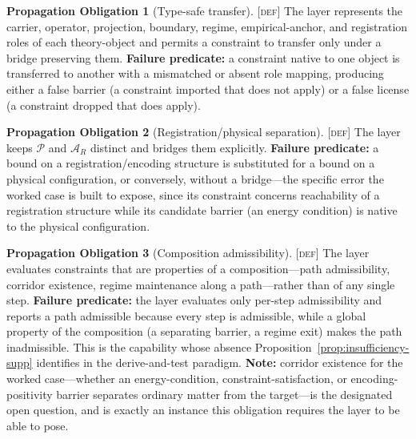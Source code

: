 \documentclass[11pt]{article}
\newcommand{\Pspace}{\ensuremath{\mathcal{P}}}
\newcommand{\ARspace}{\ensuremath{\mathcal{A}_{R}}}
\newcommand{\Defn}{\textsc{[def]}}
\theoremstyle{definition}
\newtheorem{sobligation}{Propagation Obligation}
\begin{document}
\begin{sobligation}[Type-safe transfer]\label{ob:transfer}
\Defn{} The layer represents the carrier, operator, projection, boundary, regime,
empirical-anchor, and registration roles of each theory-object and permits a
constraint to transfer only under a bridge preserving them. \textbf{Failure
predicate:} a constraint native to one object is transferred to another with a
mismatched or absent role mapping, producing either a false barrier (a constraint
imported that does not apply) or a false license (a constraint dropped that does
apply).
\end{sobligation}

\begin{sobligation}[Registration/physical separation]\label{ob:separation}
\Defn{} The layer keeps \Pspace{} and \ARspace{} distinct and bridges them
explicitly. \textbf{Failure predicate:} a bound on a registration/encoding
structure is substituted for a bound on a physical configuration, or conversely,
without a bridge---the specific error the worked case is built to expose, since its
constraint concerns reachability of a registration structure while its candidate
barrier (an energy condition) is native to the physical configuration.
\end{sobligation}

\begin{sobligation}[Composition admissibility]\label{ob:composition}
\Defn{} The layer evaluates constraints that are properties of a composition---path
admissibility, corridor existence, regime maintenance along a path---rather than of
any single step. \textbf{Failure predicate:} the layer evaluates only per-step
admissibility and reports a path admissible because every step is admissible, while
a global property of the composition (a separating barrier, a regime exit) makes the
path inadmissible. This is the capability whose absence
Proposition~\ref{prop:insufficiency-supp} identifies in the derive-and-test
paradigm. \textbf{Note:} corridor existence for the worked case---whether an
energy-condition, constraint-satisfaction, or encoding-positivity barrier separates
ordinary matter from the target---is the designated open question, and is exactly an
instance this obligation requires the layer to be able to pose.
\end{sobligation}
\end{document}
